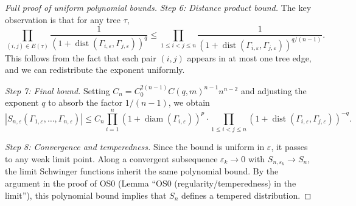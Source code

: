 \documentclass[11pt]{amsart}
\begin{document}
\begin{proof}[Full proof of uniform polynomial bounds]
\emph{Step 6: Distance product bound.} The key observation is that for any tree $\tau$,
\[
  \prod_{(i,j) \in E(\tau)} \frac{1}{(1 + \operatorname{dist}(\Gamma_{i,\varepsilon}, \Gamma_{j,\varepsilon}))^q} \le \prod_{1 \le i < j \le n} \frac{1}{(1 + \operatorname{dist}(\Gamma_{i,\varepsilon}, \Gamma_{j,\varepsilon}))^{q/(n-1)}}.
\]
This follows from the fact that each pair $(i,j)$ appears in at most one tree edge, and we can redistribute the exponent uniformly.

\emph{Step 7: Final bound.} Setting $C_n = C_0^{2(n-1)} C(q,m)^{n-1} n^{n-2}$ and adjusting the exponent $q$ to absorb the factor $1/(n-1)$, we obtain
\[
  |S_{n,\varepsilon}(\Gamma_{1,\varepsilon}, \ldots, \Gamma_{n,\varepsilon})| \le C_n \prod_{i=1}^n (1 + \operatorname{diam}(\Gamma_{i,\varepsilon}))^p \cdot \prod_{1 \le i < j \le n} (1 + \operatorname{dist}(\Gamma_{i,\varepsilon}, \Gamma_{j,\varepsilon}))^{-q}.
\]

\emph{Step 8: Convergence and temperedness.} Since the bound is uniform in $\varepsilon$, it passes to any weak limit point. Along a convergent subsequence $\varepsilon_k \to 0$ with $S_{n,\varepsilon_k} \to S_n$, the limit Schwinger functions inherit the same polynomial bound. By the argument in the proof of OS0 (Lemma ``OS0 (regularity/temperedness) in the limit''), this polynomial bound implies that $S_n$ defines a tempered distribution.
\end{proof}
\end{document}
